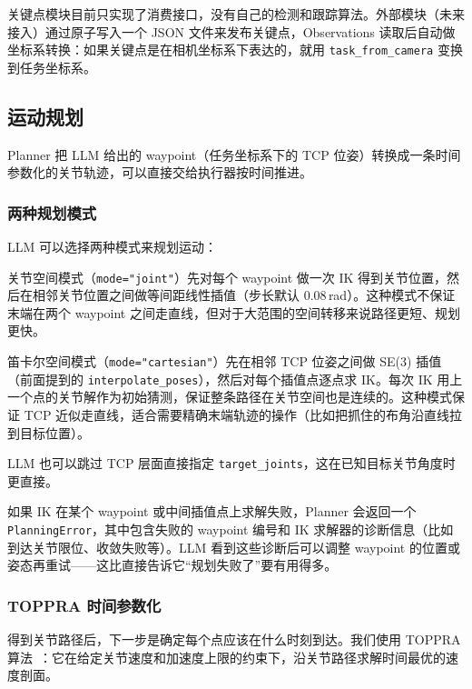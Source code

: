 关键点模块目前只实现了消费接口，没有自己的检测和跟踪算法。外部模块（未来接入）通过原子写入一个 JSON 文件来发布关键点，Observations 读取后自动做坐标系转换：如果关键点是在相机坐标系下表达的，就用 \texttt{task\_from\_camera} 变换到任务坐标系。


\subsection{运动规划}
\label{subsec:agent-planning}

Planner 把 LLM 给出的 waypoint（任务坐标系下的 TCP 位姿）转换成一条时间参数化的关节轨迹，可以直接交给执行器按时间推进。

\subsubsection{两种规划模式}

LLM 可以选择两种模式来规划运动：

关节空间模式（\texttt{mode="joint"}）先对每个 waypoint 做一次 IK 得到关节位置，然后在相邻关节位置之间做等间距线性插值（步长默认 0.08\,rad）。这种模式不保证末端在两个 waypoint 之间走直线，但对于大范围的空间转移来说路径更短、规划更快。

笛卡尔空间模式（\texttt{mode="cartesian"}）先在相邻 TCP 位姿之间做 SE(3) 插值（前面提到的 \texttt{interpolate\_poses}），然后对每个插值点逐点求 IK。每次 IK 用上一个点的关节解作为初始猜测，保证整条路径在关节空间也是连续的。这种模式保证 TCP 近似走直线，适合需要精确末端轨迹的操作（比如把抓住的布角沿直线拉到目标位置）。

LLM 也可以跳过 TCP 层面直接指定 \texttt{target\_joints}，这在已知目标关节角度时更直接。

如果 IK 在某个 waypoint 或中间插值点上求解失败，Planner 会返回一个 \texttt{PlanningError}，其中包含失败的 waypoint 编号和 IK 求解器的诊断信息（比如到达关节限位、收敛失败等）。LLM 看到这些诊断后可以调整 waypoint 的位置或姿态再重试——这比直接告诉它``规划失败了''要有用得多。

\subsubsection{TOPPRA 时间参数化}

得到关节路径后，下一步是确定每个点应该在什么时刻到达。我们使用 TOPPRA 算法~\cite{pham2018toppra}：它在给定关节速度和加速度上限的约束下，沿关节路径求解时间最优的速度剖面。

